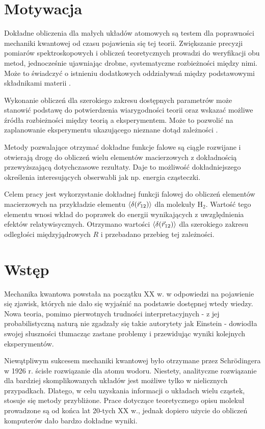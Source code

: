 \documentclass[a4paper,12pt]{article}
\numberwithin{equation}{section}
\numberwithin{table}{section}
\numberwithin{figure}{section}
\begin{document}
%
%
\setcounter{page}{4}
\section{Motywacja}
Dokładne obliczenia dla małych układów atomowych są testem dla poprawności mechaniki kwantowej od czasu pojawienia się tej teorii. Zwiększanie precyzji pomiarów spektroskopowych i obliczeń teoretycznych prowadzi do weryfikacji obu metod, jednocześnie ujawniając drobne, systematyczne rozbieżności między nimi. Może to świadczyć o istnieniu dodatkowych oddziaływań między podstawowymi składnikami materii \cite{pohl2010,salumbides2013,dickenson2013}.

Wykonanie obliczeń dla szerokiego zakresu dostępnych parametrów może stanowić podstawę do potwierdzenia wiarygodności teorii oraz wskazać możliwe źródła rozbieżności między teorią a eksperymentem. Może to pozwolić na zaplanowanie eksperymentu ukazującego nieznane dotąd zależności \cite{pohl2013}.

Metody pozwalające otrzymać dokładne funkcje falowe \cite{pachucki2010,pachucki2012,pachucki2013,pachucki2013a} są ciągle rozwijane i otwierają drogę do obliczeń wielu elementów macierzowych z dokładnością przewyższającą dotychczasowe rezultaty. Daje to możliwość dokładniejszego określenia interesujących obserwabli jak np. energia cząsteczki.

Celem pracy jest wykorzystanie dokładnej funkcji falowej do obliczeń elementów macierzowych na  przykładzie elementu $\braket{\delta({\vec{r}_{12}})}$ dla molekuły H$_2$. Wartość tego elementu wnosi wkład do poprawek do energii wynikających z uwzględnienia efektów relatywisycznych. Otrzymano wartości $\braket{\delta({\vec{r}_{12}})}$ dla szerokiego zakresu odległości międzyjądrowych $R$ i przebadano przebieg tej zależności.
\newpage

%
%
\section{Wstęp}
Mechanika kwantowa powstała na początku XX w. w odpowiedzi na pojawienie się zjawisk, których nie dało się wyjaśnić na podstawie dostępnej wtedy wiedzy. Nowa teoria, pomimo pierwotnych trudności interpretacyjnych - z jej probabilistyczną naturą nie zgadzały się takie autorytety jak Einstein - dowiodła swojej słuszności tłumacząc zastane problemy i przewidując wyniki kolejnych eksperymentów.

Niewątpliwym sukcesem mechaniki kwantowej było otrzymane przez Schr\"odingera \\w 1926 r. ścisłe rozwiązanie dla atomu wodoru. Niestety, analityczne rozwiązanie dla bardziej skomplikowanych układów jest możliwe tylko w nielicznych przypadkach. Dlatego, w celu uzyskania informacji o układach wielu cząstek, stosuje się metody przybliżone. Prace dotyczące teoretycznego opisu molekuł prowadzone są od końca lat 20-tych XX w., jednak dopiero użycie do obliczeń komputerów dało bardzo dokładne wyniki.
\end{document}
